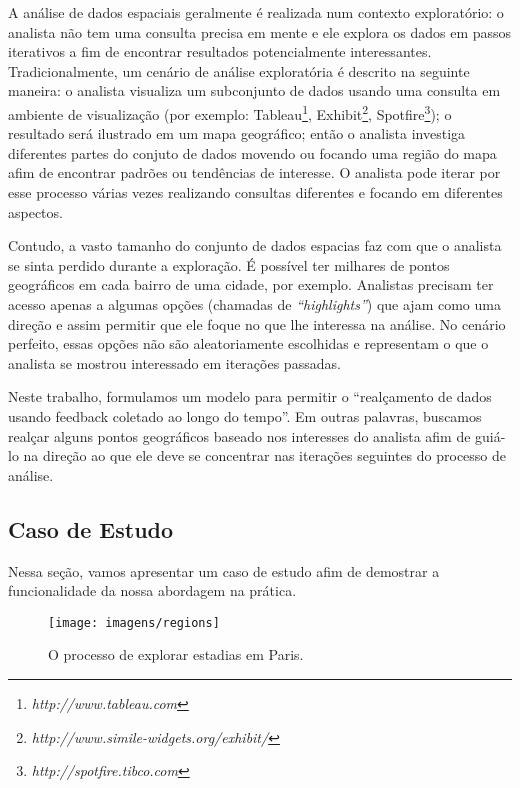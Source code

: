 A análise de dados espaciais geralmente é realizada num contexto exploratório: o analista não tem uma consulta precisa em mente e ele explora os dados em passos iterativos a fim de encontrar resultados potencialmente interessantes. Tradicionalmente, um cenário de análise exploratória é descrito na seguinte maneira: o analista visualiza um subconjunto de dados usando uma consulta em ambiente de visualização (por exemplo: Tableau\footnote{\it http://www.tableau.com},
Exhibit\footnote{\it http://www.simile-widgets.org/exhibit/},
Spotfire\footnote{\it http://spotfire.tibco.com}); o resultado será ilustrado em um mapa geográfico; então o analista investiga diferentes partes do conjuto de dados movendo ou focando uma região do mapa afim de encontrar padrões ou tendências de interesse. O analista pode iterar por esse processo várias vezes realizando consultas diferentes e focando em diferentes aspectos.

Contudo, a vasto tamanho do conjunto de dados espacias faz com que o analista se sinta perdido durante a exploração. É possível ter milhares de pontos geográficos em cada bairro de uma cidade, por exemplo. Analistas precisam ter acesso apenas a algumas opções (chamadas de {\em ``highlights''}) que ajam como uma direção e assim permitir que ele foque no que lhe interessa na análise. No cenário perfeito, essas opções não são aleatoriamente escolhidas e representam o que o analista se mostrou interessado em iterações passadas.

Neste trabalho, formulamos um modelo para permitir o ``realçamento de dados usando feedback coletado ao longo do tempo''. Em outras palavras, buscamos realçar alguns pontos geográficos baseado nos interesses do analista afim de guiá-lo na direção ao que ele deve se concentrar nas iterações seguintes do processo de análise.

\subsection{Caso de Estudo}

Nessa seção, vamos apresentar um caso de estudo afim de demostrar a funcionalidade da nossa abordagem na prática.

\begin{figure}[t]
	\centering
	\texttt{[image: imagens/regions]}
	\caption{O processo de explorar estadias em Paris.}
	\label{fig:regions}
\end{figure}

